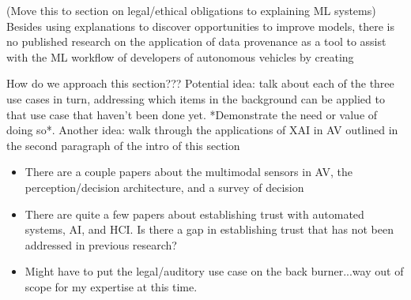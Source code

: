(Move this to section on legal/ethical obligations to explaining ML systems)  Besides using explanations to discover opportunities to improve models, there is no published research on the application of data provenance as a tool to assist with the ML workflow of developers of autonomous vehicles by creating 



How do we approach this section???  Potential idea:  talk about each of the three use cases in turn, addressing which items in the background can be applied to that use case that haven't been done yet.  *Demonstrate the need or value of doing so*.  Another idea:  walk through the applications of XAI in AV outlined in the second paragraph of the intro of this section

\begin{itemize}
    \item There are a couple papers about the multimodal sensors in AV, the perception/decision architecture, and a survey of decision 
    \item There are quite a few papers about establishing trust with automated systems, AI, and HCI.  Is there a gap in establishing trust that has not been addressed in previous research?
    \item Might have to put the legal/auditory use case on the back burner...way out of scope for my expertise at this time.
\end{itemize}
